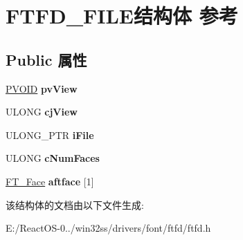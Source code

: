 \hypertarget{struct_f_t_f_d___f_i_l_e}{}\section{F\+T\+F\+D\+\_\+\+F\+I\+L\+E结构体 参考}
\label{struct_f_t_f_d___f_i_l_e}
\subsection*{Public 属性}
\begin{DoxyCompactItemize}
\item 
\mbox{\label{struct_f_t_f_d___f_i_l_e_ac63cb1cd2b8de3a59b064d35ae3962a3}} 
\hyperlink{interfacevoid}{P\+V\+O\+ID} {\bfseries pv\+View}
\item 
\mbox{\label{struct_f_t_f_d___f_i_l_e_ab8db0b9c83ca7d2cc2e254227f5085f7}} 
U\+L\+O\+NG {\bfseries cj\+View}
\item 
\mbox{\label{struct_f_t_f_d___f_i_l_e_a15133858e1ff921a5cf89a5039866469}} 
U\+L\+O\+N\+G\+\_\+\+P\+TR {\bfseries i\+File}
\item 
\mbox{\label{struct_f_t_f_d___f_i_l_e_a1a6b5e92bc9defe3b3b50204a6c76d17}} 
U\+L\+O\+NG {\bfseries c\+Num\+Faces}
\item 
\mbox{\label{struct_f_t_f_d___f_i_l_e_ae7ee3684ad175405c03e4fb6239af443}} 
\hyperlink{struct_f_t___face_rec__}{F\+T\+\_\+\+Face} {\bfseries aftface} \mbox{[}1\mbox{]}
\end{DoxyCompactItemize}


该结构体的文档由以下文件生成\+:\begin{DoxyCompactItemize}
\item 
E\+:/\+React\+O\+S-\/0../win32ss/drivers/font/ftfd/ftfd.\+h\end{DoxyCompactItemize}
